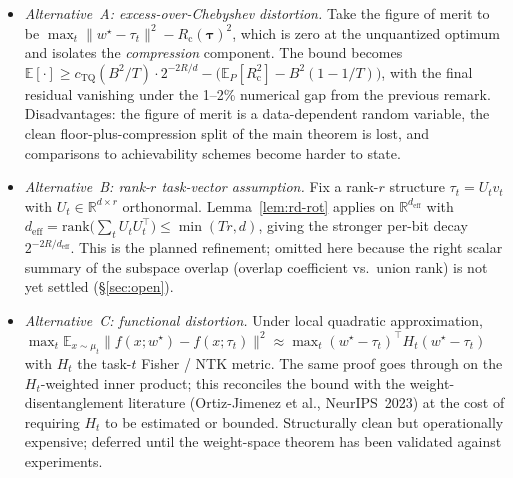 \documentclass{article}
\theoremstyle{remark}
\newcommand{\R}{\mathbb{R}}
\newcommand{\E}{\mathbb{E}}
\newcommand{\rank}{\mathrm{rank}}
\newcommand{\cheb}{R_{\mathrm{c}}}
\begin{document}
\begin{itemize}
  \item \emph{Alternative~A: excess-over-Chebyshev distortion.} Take
  the figure of merit to be $\max_t\|w^\star - \tau_t\|^2 -
  \cheb(\boldsymbol\tau)^2$, which is zero at the unquantized optimum
  and isolates the \emph{compression} component. The bound becomes
  $\E[\cdot] \geq c_{\mathrm{TQ}}(B^2/T)\cdot 2^{-2R/d} -
  \bigl(\E_P[\cheb^2] - B^2(1-1/T)\bigr)$, with the final residual
  vanishing under the 1--2\% numerical gap from the previous remark.
  Disadvantages: the figure of merit is a data-dependent random
  variable, the clean floor-plus-compression split of the main
  theorem is lost, and comparisons to achievability schemes become
  harder to state.
  \item \emph{Alternative~B: rank-$r$ task-vector assumption.} Fix a
  rank-$r$ structure $\tau_t = U_t v_t$ with $U_t \in \R^{d\times r}$
  orthonormal. Lemma~\ref{lem:rd-rot} applies on
  $\R^{d_{\mathrm{eff}}}$ with $d_{\mathrm{eff}} =
  \rank\bigl(\sum_t U_t U_t^\top\bigr)\leq\min(Tr,d)$, giving the
  stronger per-bit decay $2^{-2R/d_{\mathrm{eff}}}$. This is the
  planned refinement; omitted here because the right scalar summary
  of the subspace overlap (overlap coefficient vs.\ union rank) is not
  yet settled (\S\ref{sec:open}).
  \item \emph{Alternative~C: functional distortion.} Under local
  quadratic approximation, $\max_t\E_{x\sim\mu_t}\|f(x;w^\star) -
  f(x;\tau_t)\|^2 \approx \max_t(w^\star-\tau_t)^\top H_t(w^\star -
  \tau_t)$ with $H_t$ the task-$t$ Fisher / NTK metric. The same
  proof goes through on the $H_t$-weighted inner product; this
  reconciles the bound with the weight-disentanglement literature
  (Ortiz-Jimenez et al., NeurIPS~2023) at the cost of requiring $H_t$
  to be estimated or bounded. Structurally clean but operationally
  expensive; deferred until the weight-space theorem has been
  validated against experiments.
\end{itemize}
\end{document}
